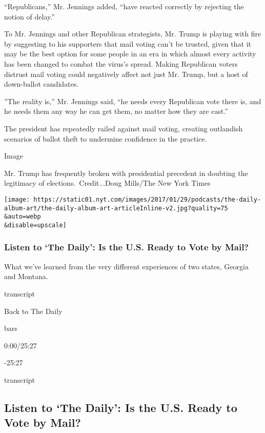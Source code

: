 ``Republicans,'' Mr. Jennings added, ``have reacted correctly by
rejecting the notion of delay.''

To Mr. Jennings and other Republican strategists, Mr. Trump is playing
with fire by suggesting to his supporters that mail voting can't be
trusted, given that it may be the best option for some people in an era
in which almost every activity has been changed to combat the virus's
spread. Making Republican voters distrust mail voting could negatively
affect not just Mr. Trump, but a host of down-ballot candidates.

''The reality is,'' Mr. Jennings said, ``he needs every Republican vote
there is, and he needs them any way he can get them, no matter how they
are cast.''

The president has repeatedly railed against mail voting, creating
outlandish scenarios of ballot theft to undermine confidence in the
practice.

Image

Mr. Trump has frequently broken with presidential precedent in doubting
the legitimacy of elections.~Credit...Doug Mills/The New York Times

\texttt{[image: https://static01.nyt.com/images/2017/01/29/podcasts/the-daily-album-art/the-daily-album-art-articleInline-v2.jpg?quality=75\\\&auto=webp\\\&disable=upscale]}

\hypertarget{listen-to-the-daily-is-the-us-ready-to-vote-by-mail}{%
\subsubsection{Listen to `The Daily': Is the U.S. Ready to Vote by
Mail?}\label{listen-to-the-daily-is-the-us-ready-to-vote-by-mail}}

What we've learned from the very different experiences of two states,
Georgia and Montana.

transcript

Back to The Daily

bars

0:00/25:27

-25:27

transcript

\hypertarget{listen-to-the-daily-is-the-us-ready-to-vote-by-mail-1}{%
\subsection{Listen to `The Daily': Is the U.S. Ready to Vote by
Mail?}\label{listen-to-the-daily-is-the-us-ready-to-vote-by-mail-1}}

